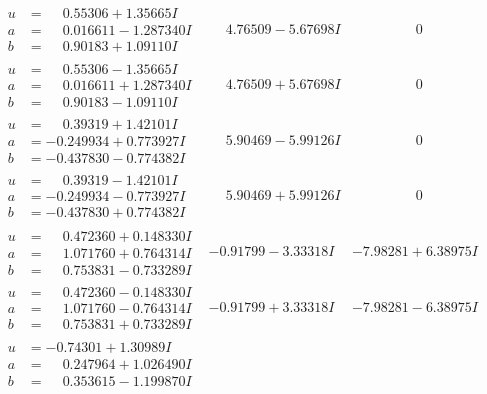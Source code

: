 \documentclass[1p]{elsarticle_modified}
\theoremstyle{definition}
\begin{document}
$$\begin{array}{c|c|c}
\begin{aligned}
u &= \phantom{-}0.55306 + 1.35665 I \\
a &= \phantom{-}0.016611 - 1.287340 I \\
b &= \phantom{-}0.90183 + 1.09110 I\end{aligned}
 & \phantom{-}4.76509 - 5.67698 I & \phantom{-0.000000 } 0 \\ \hline\begin{aligned}
u &= \phantom{-}0.55306 - 1.35665 I \\
a &= \phantom{-}0.016611 + 1.287340 I \\
b &= \phantom{-}0.90183 - 1.09110 I\end{aligned}
 & \phantom{-}4.76509 + 5.67698 I & \phantom{-0.000000 } 0 \\ \hline\begin{aligned}
u &= \phantom{-}0.39319 + 1.42101 I \\
a &= -0.249934 + 0.773927 I \\
b &= -0.437830 - 0.774382 I\end{aligned}
 & \phantom{-}5.90469 - 5.99126 I & \phantom{-0.000000 } 0 \\ \hline\begin{aligned}
u &= \phantom{-}0.39319 - 1.42101 I \\
a &= -0.249934 - 0.773927 I \\
b &= -0.437830 + 0.774382 I\end{aligned}
 & \phantom{-}5.90469 + 5.99126 I & \phantom{-0.000000 } 0 \\ \hline\begin{aligned}
u &= \phantom{-}0.472360 + 0.148330 I \\
a &= \phantom{-}1.071760 + 0.764314 I \\
b &= \phantom{-}0.753831 - 0.733289 I\end{aligned}
 & -0.91799 - 3.33318 I & -7.98281 + 6.38975 I \\ \hline\begin{aligned}
u &= \phantom{-}0.472360 - 0.148330 I \\
a &= \phantom{-}1.071760 - 0.764314 I \\
b &= \phantom{-}0.753831 + 0.733289 I\end{aligned}
 & -0.91799 + 3.33318 I & -7.98281 - 6.38975 I \\ \hline\begin{aligned}
u &= -0.74301 + 1.30989 I \\
a &= \phantom{-}0.247964 + 1.026490 I \\
b &= \phantom{-}0.353615 - 1.199870 I\end{aligned}

\end{array}$$
\end{document}
